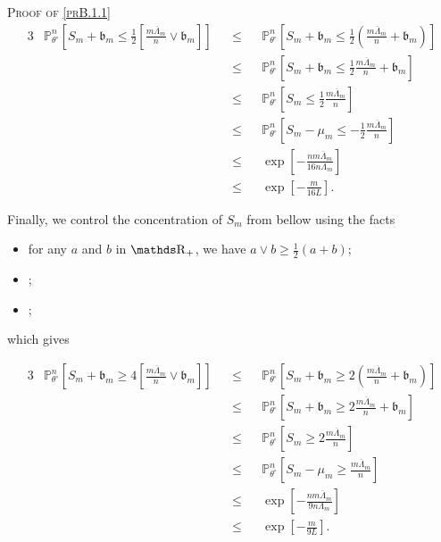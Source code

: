 \begin{pro}{\textsc{Proof of \textsc{\cref{prB.1.1}}} \\}
\begin{alignat*}{3}
& \mathds{P}_{\theta^{\circ}}^{n}\left[S_{m} + \mathfrak{b}_{m} \leq \frac{1}{2} \left[\frac{m \overline{\Lambda}_{m}}{n} \vee \mathfrak{b}_{m}\right] \right] && \leq && \mathds{P}_{\theta^{\circ}}^{n}\left[S_{m} + \mathfrak{b}_{m} \leq \frac{1}{2} \left(\frac{m \overline{\Lambda}_{m}}{n} + \mathfrak{b}_{m}\right) \right]\\
& && \leq && \mathds{P}_{\theta^{\circ}}^{n}\left[S_{m} + \mathfrak{b}_{m} \leq \frac{1}{2} \frac{m \overline{\Lambda}_{m}}{n} + \mathfrak{b}_{m} \right]\\
& && \leq && \mathds{P}_{\theta^{\circ}}^{n}\left[S_{m} \leq \frac{1}{2} \frac{m \overline{\Lambda}_{m}}{n}\right]\\
& && \leq && \mathds{P}_{\theta^{\circ}}^{n}\left[S_{m} - \mu_{m} \leq -\frac{1}{2} \frac{m \overline{\Lambda}_{m}}{n}\right]\\
& && \leq && \exp\left[- \frac{n m \overline{\Lambda}_{m}}{16 n \Lambda_{m}}\right]\\
& && \leq && \exp\left[- \frac{m}{16 L}\right].
\end{alignat*}

Finally, we control the concentration of $S_{m}$ from bellow using the facts

\begin{itemize}
\item for any $a$ and $b$ in $\R_{+}$, we have $a \vee b \geq \frac{1}{2}(a+b)$;
\item {};
\item {};
\end{itemize}

which gives

\begin{alignat*}{3}
& \mathds{P}_{\theta^{\circ}}^{n}\left[S_{m} + \mathfrak{b}_{m} \geq 4 \left[\frac{m \overline{\Lambda}_{m}}{n} \vee \mathfrak{b}_{m}\right] \right] && \leq && \mathds{P}_{\theta^{\circ}}^{n}\left[S_{m} + \mathfrak{b}_{m} \geq 2 \left(\frac{m \overline{\Lambda}_{m}}{n} + \mathfrak{b}_{m}\right) \right]\\
& && \leq && \mathds{P}_{\theta^{\circ}}^{n}\left[S_{m} + \mathfrak{b}_{m} \geq 2 \frac{m \overline{\Lambda}_{m}}{n} + \mathfrak{b}_{m} \right]\\
& && \leq && \mathds{P}_{\theta^{\circ}}^{n}\left[S_{m} \geq 2 \frac{m \overline{\Lambda}_{m}}{n}\right]\\
& && \leq && \mathds{P}_{\theta^{\circ}}^{n}\left[S_{m} - \mu_{m} \geq \frac{ m \overline{\Lambda}_{m}}{n}\right]\\
& && \leq && \exp\left[- \frac{n m \overline{\Lambda}_{m}}{9 n \Lambda_{m}}\right]\\
& && \leq && \exp\left[- \frac{m}{9 L}\right].
\end{alignat*}
\end{pro}


